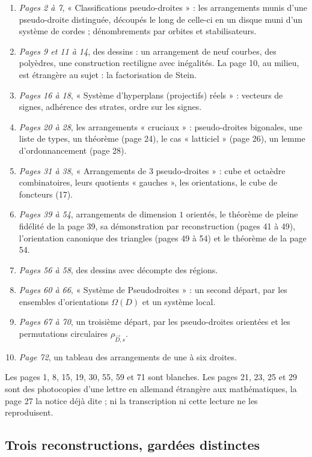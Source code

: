 \documentclass[11pt,a4paper]{article}
\begin{document}
\begin{enumerate}
  \item \emph{Pages 2 à 7}, « Classifications pseudo-droites » : les
  arrangements munis d'une pseudo-droite distinguée, découpés le long de
  celle-ci en un disque muni d'un système de cordes ; dénombrements par
  orbites et stabilisateurs.
  \item \emph{Pages 9 et 11 à 14}, des dessins : un arrangement de neuf
  courbes, des polyèdres, une construction rectiligne avec inégalités. La
  page 10, au milieu, est étrangère au sujet : la factorisation de Stein.
  \item \emph{Pages 16 à 18}, « Système d'hyperplans (projectifs) réels » :
  vecteurs de signes, adhérence des strates, ordre sur les signes.
  \item \emph{Pages 20 à 28}, les arrangements « cruciaux » : pseudo-droites
  bigonales, une liste de types, un théorème (page 24), le cas
  « latticiel » (page 26), un lemme d'ordonnancement (page 28).
  \item \emph{Pages 31 à 38}, « Arrangements de 3 pseudo-droites » : cube et
  octaèdre combinatoires, leurs quotients « gauches », les orientations, le
  cube de foncteurs (17).
  \item \emph{Pages 39 à 54}, arrangements de dimension $1$ orientés, le
  théorème de pleine fidélité de la page 39, sa démonstration par
  reconstruction (pages 41 à 49), l'orientation canonique des triangles
  (pages 49 à 54) et le théorème de la page 54.
  \item \emph{Pages 56 à 58}, des dessins avec décompte des régions.
  \item \emph{Pages 60 à 66}, « Système de Pseudodroites » : un second
  départ, par les ensembles d'orientations $\Omega(D)$ et un système local.
  \item \emph{Pages 67 à 70}, un troisième départ, par les pseudo-droites
  orientées et les permutations circulaires $\rho_{\vec{D},s}$.
  \item \emph{Page 72}, un tableau des arrangements de une à six droites.
\end{enumerate}

Les pages 1, 8, 15, 19, 30, 55, 59 et 71 sont blanches. Les pages 21, 23, 25
et 29 sont des photocopies d'une lettre en allemand étrangère aux
mathématiques, la page 27 la notice déjà dite ; ni la transcription ni cette
lecture ne les reproduisent.

\subsection*{Trois reconstructions, gardées distinctes}
\end{document}
